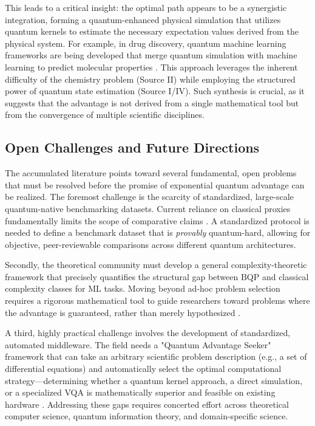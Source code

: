\documentclass{article}
\begin{document}
This leads to a critical insight: the optimal path appears to be a synergistic integration, forming a quantum-enhanced physical simulation that utilizes quantum kernels to estimate the necessary expectation values derived from the physical system. For example, in drug discovery, quantum machine learning frameworks are being developed that merge quantum simulation with machine learning to predict molecular properties \cite{mensa2023quantum}. This approach leverages the inherent difficulty of the chemistry problem (Source II) while employing the structured power of quantum state estimation (Source I/IV). Such synthesis is crucial, as it suggests that the advantage is not derived from a single mathematical tool but from the convergence of multiple scientific disciplines.

\subsection{Open Challenges and Future Directions}

\label{sec:open\_challenges\_and\_future\_directions}

The accumulated literature points toward several fundamental, open problems that must be resolved before the promise of exponential quantum advantage can be realized. The foremost challenge is the scarcity of standardized, large-scale quantum-native benchmarking datasets. Current reliance on classical proxies fundamentally limits the scope of comparative claims \cite{cerezo2022challenges}. A standardized protocol is needed to define a benchmark dataset that is \textit{provably} quantum-hard, allowing for objective, peer-reviewable comparisons across different quantum architectures.

Secondly, the theoretical community must develop a general complexity-theoretic framework that precisely quantifies the structural gap between $\text{BQP}$ and classical complexity classes for ML tasks. Moving beyond ad-hoc problem selection requires a rigorous mathematical tool to guide researchers toward problems where the advantage is guaranteed, rather than merely hypothesized \cite{huang2021informationtheoretic}.

A third, highly practical challenge involves the development of standardized, automated middleware. The field needs a "Quantum Advantage Seeker" framework that can take an arbitrary scientific problem description (e.g., a set of differential equations) and automatically select the optimal computational strategy---determining whether a quantum kernel approach, a direct simulation, or a specialized VQA is mathematically superior and feasible on existing hardware \cite{marcantonio2023quantum}. Addressing these gaps requires concerted effort across theoretical computer science, quantum information theory, and domain-specific science.
\end{document}
